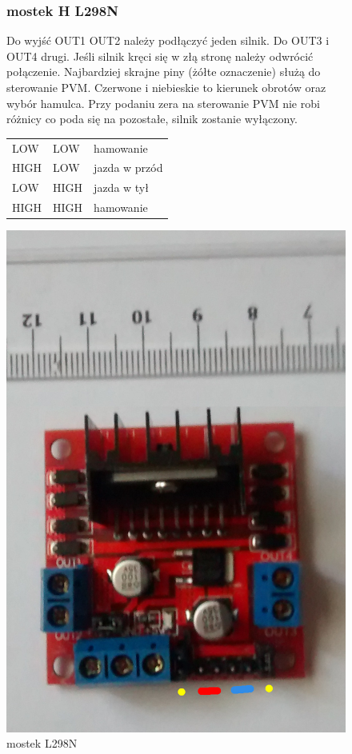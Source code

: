 \documentclass[a4paper,11pt]{article}
\def\SCALE{0.6}
\begin{document}
\begin{figure}[H]
	\subsubsection{mostek H L298N}
	Do wyjść OUT1 OUT2 należy podłączyć jeden silnik. Do OUT3 i OUT4 drugi. Jeśli silnik kręci się w złą stronę należy odwrócić połączenie.
	Najbardziej skrajne piny (żółte oznaczenie) służą do sterowanie PVM. Czerwone i niebieskie to kierunek obrotów oraz wybór hamulca. Przy podaniu zera na sterowanie PVM nie robi różnicy co poda się na pozostałe, silnik zostanie wyłączony.
	
	\begin{tabular}{|l|l|l|}
		\hline
		LOW & LOW & hamowanie \\
		HIGH & LOW & jazda w przód \\
		LOW & HIGH & jazda w tył \\
		HIGH & HIGH & hamowanie \\
		\hline				
	
	\end{tabular}
	\centering
	\includegraphics[width=\SCALE
	\paperwidth]{mostek}
	\caption{mostek L298N}
\end{figure}
\end{document}
